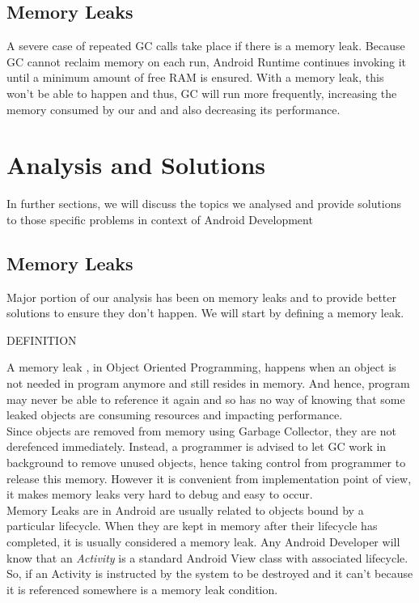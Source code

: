 \documentclass[journal]{IEEEtran}
\begin{document}
\subsection{Memory Leaks}
A severe case of repeated GC calls take place if there is a memory leak. Because GC cannot reclaim memory on each run, Android Runtime continues invoking it until a minimum amount of free RAM is ensured. With a memory leak, this won't be able to happen and thus, GC will run more frequently, increasing the memory consumed by our and and also decreasing its performance.

\newpage

\section{Analysis and Solutions}
In further sections, we will discuss the topics we analysed and provide solutions to those specific problems in context of Android Development

\subsection{Memory Leaks}
Major portion of our analysis has been on memory leaks and to provide better solutions to ensure they don't happen. We will start by defining a memory leak.\\

\begin{center}
	DEFINITION
\end{center}
A memory leak \cite{memleak}, in Object Oriented Programming, happens when an object is not needed in program anymore and still resides in memory. And hence, program may never be able to reference it again and so has no way of knowing that some leaked objects are consuming resources and impacting performance.\\
Since objects are removed from memory using Garbage Collector, they are not derefenced immediately. Instead, a programmer is advised to let GC work in background to remove unused objects, hence taking control from programmer to release this memory. However it is convenient from implementation point of view, it makes memory leaks very hard to debug and easy to occur.\\

Memory Leaks are in Android are usually related to objects bound by a particular lifecycle. When they are kept in memory after their lifecycle has completed, it is usually considered a memory leak. Any Android Developer will know that an \emph{Activity} is a standard Android View class with associated lifecycle. So, if an Activity is instructed by the system to be destroyed and it can't because it is referenced somewhere is a memory leak condition.\\
\end{document}
